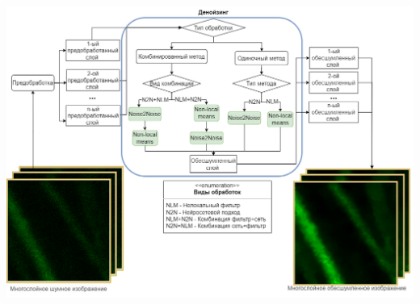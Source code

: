 \begin{minipage}{\textwidth}
	\centering
	\vspace{\mfloatsep} %
	\includegraphics[keepaspectratio=true,scale=0.3] {my_folder/images/denoising/schema_denoising.png}
	\label{fig:3d-denoise-schema}  
	\vspace{\mfloatsep} %
\end{minipage}

